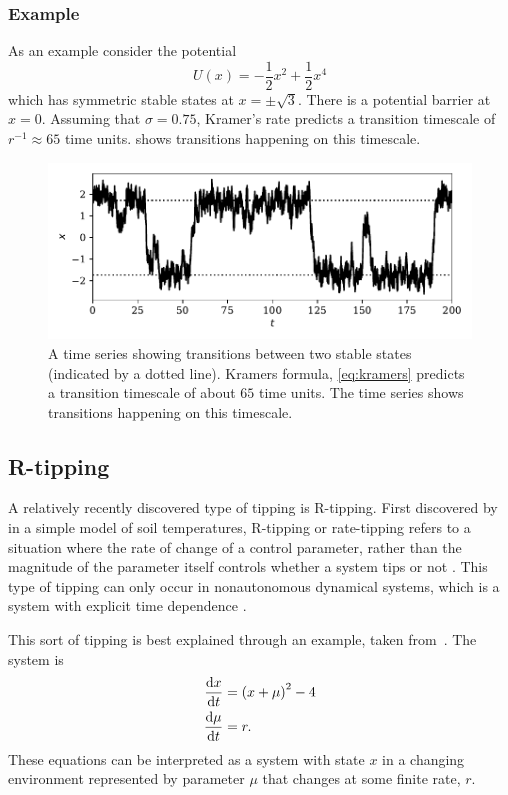 \subsubsection{Example}
As an example consider the potential
\begin{equation}
  \label{eq:example_potential}
  U(x) = -\frac{1}{2}x^2 + \frac{1}{2}x^4
\end{equation}
which has symmetric stable states at $x = \pm \sqrt{3}$. There is a potential barrier at $x = 0$. Assuming that $\sigma = 0.75$, Kramer's rate predicts a transition
timescale of $r^{-1} \approx 65$ time units.  shows transitions happening on this timescale.

\begin{figure}
  \centering
  \includegraphics[width=\textwidth,keepaspectratio]{noise_trans}
  \caption[An example of N-tipping]{A time series showing transitions between two stable states (indicated by a dotted line). Kramers formula, \cref{eq:kramers} predicts a
    transition timescale of about $65$ time units. The time series shows transitions happening on this timescale.}
  \label{fig:ntipping}
\end{figure}


\subsection{R-tipping}
A relatively recently discovered type of tipping is R-tipping. First discovered by~\cite{Luke2011} in a simple model of soil temperatures, R-tipping or rate-tipping refers to
a situation where the rate of change of a control parameter, rather than the magnitude of the parameter itself  controls whether a system tips or not \parencite{Perryman2014a}.
This type of tipping can only occur in nonautonomous dynamical systems, which is a system with explicit time dependence \parencite{Ashwin2017a}.

This sort of tipping is best explained through an example, taken from~\cite{Ashwin2012}. The system is
\begin{subequations}
  \label{eq:rtipping_example}
  \begin{align}
    \dv{x}{t}   &= \left(x + \mu\right)^2 - 4 \label{eq:rtipping_example_x} \\
    \dv{\mu}{t} &= r.                          \label{eq:rtipping_example_r} 
  \end{align}
\end{subequations}
These equations can be interpreted as a system with state $x$ in a changing environment represented by parameter $\mu$ that changes at some finite rate, $r$.

